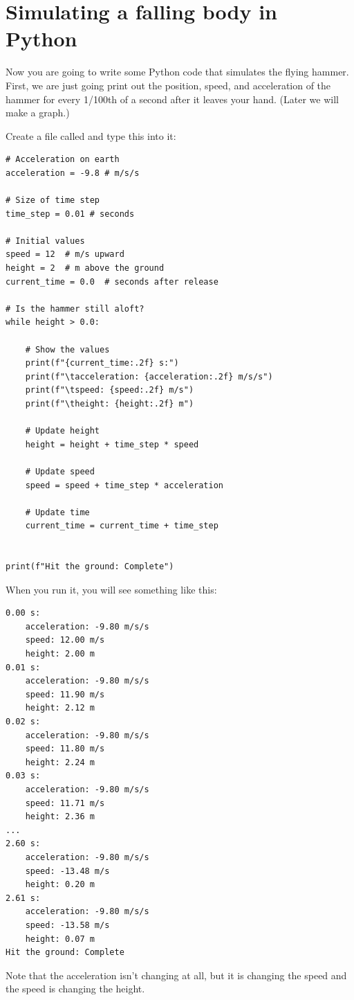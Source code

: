 \section{Simulating a falling body in Python}

Now you are going to write some Python code that simulates the flying hammer. First, we are just going print out the position, speed, and acceleration of the hammer for every 1/100th of a second after it leaves your hand. (Later we will make a graph.)

Create a file called  and type this into it:

\begin{Verbatim}
# Acceleration on earth
acceleration = -9.8 # m/s/s

# Size of time step
time_step = 0.01 # seconds

# Initial values
speed = 12  # m/s upward
height = 2  # m above the ground
current_time = 0.0  # seconds after release

# Is the hammer still aloft?
while height > 0.0:

    # Show the values
    print(f"{current_time:.2f} s:")
    print(f"\tacceleration: {acceleration:.2f} m/s/s")
    print(f"\tspeed: {speed:.2f} m/s")
    print(f"\theight: {height:.2f} m")

    # Update height
    height = height + time_step * speed

    # Update speed
    speed = speed + time_step * acceleration

    # Update time
    current_time = current_time + time_step


print(f"Hit the ground: Complete")
\end{Verbatim}

When you run it, you will see something like this:
\begin{Verbatim}
0.00 s:
	acceleration: -9.80 m/s/s
	speed: 12.00 m/s
	height: 2.00 m
0.01 s:
	acceleration: -9.80 m/s/s
	speed: 11.90 m/s
	height: 2.12 m
0.02 s:
	acceleration: -9.80 m/s/s
	speed: 11.80 m/s
	height: 2.24 m
0.03 s:
	acceleration: -9.80 m/s/s
	speed: 11.71 m/s
	height: 2.36 m
...
2.60 s:
	acceleration: -9.80 m/s/s
	speed: -13.48 m/s
	height: 0.20 m
2.61 s:
	acceleration: -9.80 m/s/s
	speed: -13.58 m/s
	height: 0.07 m
Hit the ground: Complete
\end{Verbatim}

Note that the acceleration isn't changing at all, but it is changing
the speed and the speed is changing the height.


